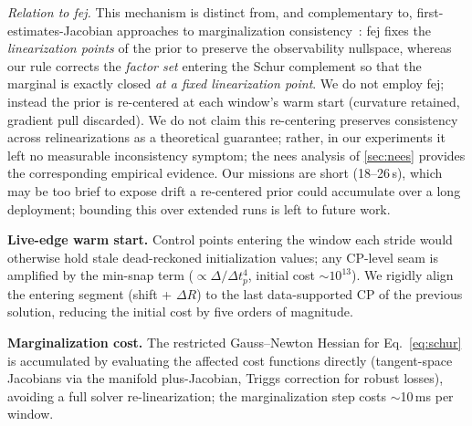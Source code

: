\emph{Relation to \ac{fej}.}  This mechanism is distinct from, and
complementary to, first-estimates-Jacobian approaches to
marginalization consistency~\cite{dongsi2012consistency}: \ac{fej} fixes
the \emph{linearization points} of the prior to preserve the
observability nullspace, whereas our rule corrects the
\emph{factor set} entering the Schur complement so that the marginal
is exactly closed \emph{at a fixed linearization point}.  We do not
employ \ac{fej}; instead the prior is re-centered at each window's warm
start (curvature retained, gradient pull discarded).  We do not claim
this re-centering preserves consistency across relinearizations as a
theoretical guarantee; rather, in our experiments it left no measurable
inconsistency symptom; the \ac{nees} analysis of
\autoref{sec:nees} provides the corresponding empirical evidence.
Our missions are short (18--26\,s), which may be too brief to expose
drift a re-centered prior could accumulate over a long deployment;
bounding this over extended runs is left to future work.

\textbf{Live-edge warm start.}
Control points entering the window each stride would otherwise hold
stale dead-reckoned initialization values; any CP-level seam is
amplified by the min-snap term ($\propto \Delta/\Delta t_p^4$, initial
cost $\sim$$10^{13}$).  We rigidly align the entering segment (shift +
$\Delta R$) to the last data-supported CP of the previous solution,
reducing the initial cost by five orders of magnitude.

\textbf{Marginalization cost.}
The restricted Gauss--Newton Hessian for Eq.~\eqref{eq:schur} is
accumulated by evaluating the affected cost functions directly
(tangent-space Jacobians via the manifold plus-Jacobian, Triggs
correction for robust losses), avoiding a full solver re-linearization;
the marginalization step costs $\sim$10\,ms per window.
